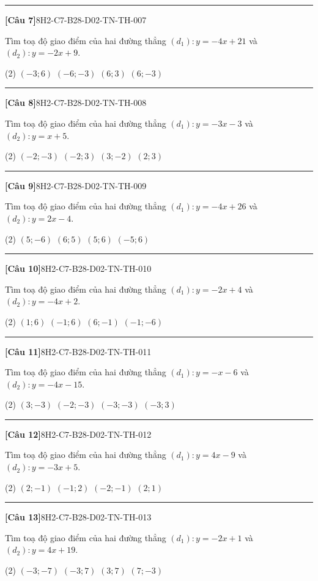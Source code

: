 \documentclass[12pt,a4paper]{article}
\newif\ifloigiai
\newenvironment{cauhoi}[2]{%
  \par\medskip\noindent\rule{\textwidth}{0.4pt}\par\nopagebreak
  \noindent\textbf{[#1]}\hfill{\scriptsize\ttfamily #2}\par\nopagebreak\smallskip}{\par}
\newcommand{\dapan}[1]{\ifloigiai\par\smallskip\noindent\textit{Đáp án:} \textbf{#1}\par\fi}
\begin{document}
\begin{cauhoi}{Câu 7}{8H2-C7-B28-D02-TN-TH-007}
Tìm toạ độ giao điểm của hai đường thẳng $(d_1): y=-4x+21$ và $(d_2): y=-2x+9$.
\begin{tasks}(2)
\task $(-3;6)$
\task $(-6;-3)$
\task $(6;3)$
\task $(6;-3)$
\end{tasks}
\dapan{D}
\end{cauhoi}
\begin{cauhoi}{Câu 8}{8H2-C7-B28-D02-TN-TH-008}
Tìm toạ độ giao điểm của hai đường thẳng $(d_1): y=-3x-3$ và $(d_2): y=x+5$.
\begin{tasks}(2)
\task $(-2;-3)$
\task $(-2;3)$
\task $(3;-2)$
\task $(2;3)$
\end{tasks}
\dapan{B}
\end{cauhoi}
\begin{cauhoi}{Câu 9}{8H2-C7-B28-D02-TN-TH-009}
Tìm toạ độ giao điểm của hai đường thẳng $(d_1): y=-4x+26$ và $(d_2): y=2x-4$.
\begin{tasks}(2)
\task $(5;-6)$
\task $(6;5)$
\task $(5;6)$
\task $(-5;6)$
\end{tasks}
\dapan{C}
\end{cauhoi}
\begin{cauhoi}{Câu 10}{8H2-C7-B28-D02-TN-TH-010}
Tìm toạ độ giao điểm của hai đường thẳng $(d_1): y=-2x+4$ và $(d_2): y=-4x+2$.
\begin{tasks}(2)
\task $(1;6)$
\task $(-1;6)$
\task $(6;-1)$
\task $(-1;-6)$
\end{tasks}
\dapan{B}
\end{cauhoi}
\begin{cauhoi}{Câu 11}{8H2-C7-B28-D02-TN-TH-011}
Tìm toạ độ giao điểm của hai đường thẳng $(d_1): y=-x-6$ và $(d_2): y=-4x-15$.
\begin{tasks}(2)
\task $(3;-3)$
\task $(-2;-3)$
\task $(-3;-3)$
\task $(-3;3)$
\end{tasks}
\dapan{C}
\end{cauhoi}
\begin{cauhoi}{Câu 12}{8H2-C7-B28-D02-TN-TH-012}
Tìm toạ độ giao điểm của hai đường thẳng $(d_1): y=4x-9$ và $(d_2): y=-3x+5$.
\begin{tasks}(2)
\task $(2;-1)$
\task $(-1;2)$
\task $(-2;-1)$
\task $(2;1)$
\end{tasks}
\dapan{A}
\end{cauhoi}
\begin{cauhoi}{Câu 13}{8H2-C7-B28-D02-TN-TH-013}
Tìm toạ độ giao điểm của hai đường thẳng $(d_1): y=-2x+1$ và $(d_2): y=4x+19$.
\begin{tasks}(2)
\task $(-3;-7)$
\task $(-3;7)$
\task $(3;7)$
\task $(7;-3)$
\end{tasks}
\dapan{B}
\end{cauhoi}
\end{document}

